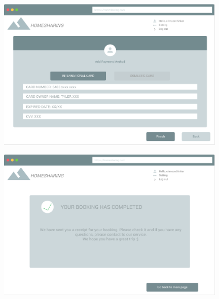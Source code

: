 \begin{figure}[H]
	\centering
	\includegraphics[width=11cm]{parts/Khoa/khoa_ui/5.png}
\end{figure}
\newpage 
\begin{figure}[H]
	\centering
	\includegraphics[width=11cm]{parts/Khoa/khoa_ui/6.png}
\end{figure}
\newpage 